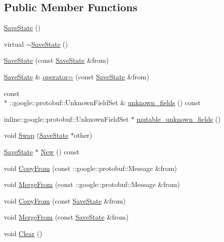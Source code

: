 \subsection*{Public Member Functions}
\begin{DoxyCompactItemize}
\item 
\hyperlink{class_save_state_a0023ddee528f4cd97fdd264675147c8a}{Save\-State} ()
\item 
virtual \hyperlink{class_save_state_ac3a675443b8665ee7f69708233b12453}{$\sim$\-Save\-State} ()
\item 
\hyperlink{class_save_state_a316e4e2358d79d3d8111e3672a5acc2f}{Save\-State} (const \hyperlink{class_save_state}{Save\-State} \&from)
\item 
\hyperlink{class_save_state}{Save\-State} \& \hyperlink{class_save_state_a19ecd68fa3882195fa3a71580ccebcad}{operator=} (const \hyperlink{class_save_state}{Save\-State} \&from)
\item 
const \\*
\-::google\-::protobuf\-::\-Unknown\-Field\-Set \& \hyperlink{class_save_state_afe5ddbed34fe49927ae07fb0397652dd}{unknown\-\_\-fields} () const 
\item 
inline\-::google\-::protobuf\-::\-Unknown\-Field\-Set $\ast$ \hyperlink{class_save_state_a0760d6646dc4abcb7d22665e8434c1bc}{mutable\-\_\-unknown\-\_\-fields} ()
\item 
void \hyperlink{class_save_state_a72020c4bceabb86bbfbd938e5cb4c8ef}{Swap} (\hyperlink{class_save_state}{Save\-State} $\ast$other)
\item 
\hyperlink{class_save_state}{Save\-State} $\ast$ \hyperlink{class_save_state_a291bca00915ed246ffe4b8140756fd5c}{New} () const 
\item 
void \hyperlink{class_save_state_a1b9c8192e71bb76356c49aca9d40ce7e}{Copy\-From} (const \-::google\-::protobuf\-::\-Message \&from)
\item 
void \hyperlink{class_save_state_a70ecbdbf8b573cf7fc3bc266dcd63eac}{Merge\-From} (const \-::google\-::protobuf\-::\-Message \&from)
\item 
void \hyperlink{class_save_state_a364258d6d1e94f74499980453a58ddbd}{Copy\-From} (const \hyperlink{class_save_state}{Save\-State} \&from)
\item 
void \hyperlink{class_save_state_a396590e9137bcd2c3f43f2ac66e0450c}{Merge\-From} (const \hyperlink{class_save_state}{Save\-State} \&from)
\item 
void \hyperlink{class_save_state_a7f9bdede70e3acb1863aae58b8b8eff0}{Clear} ()
\item 

\end{DoxyCompactItemize}
